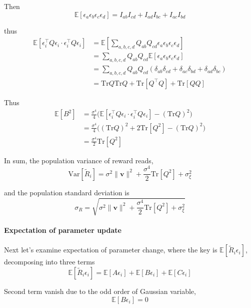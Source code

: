     Then 
    \[
    \mathbb{E}[\epsilon_{a}\epsilon_{b}\epsilon_{c}\epsilon_{d}]=I_{ab}I_{cd}+I_{ad}I_{bc}+I_{ac}I_{bd}
    \]
    
    thus 
    \begin{align*}
    \mathbb{E}[\epsilon_{i}^{\top}Q\epsilon_{i}\cdot\epsilon_{i}^{\top}Q\epsilon_{i}] & =\mathbb{E}[\sum_{a,b,c,d}Q_{ab}Q_{cd}\epsilon_{a}\epsilon_{b}\epsilon_{c}\epsilon_{d}]\\
     & =\sum_{a,b,c,d}Q_{ab}Q_{cd}\mathbb{E}[\epsilon_{a}\epsilon_{b}\epsilon_{c}\epsilon_{d}]\\
     & =\sum_{a,b,c,d}Q_{ab}Q_{cd}(\delta_{ab}\delta_{cd}+\delta_{ac}\delta_{bd}+\delta_{ad}\delta_{bc})\\
     & =\mathrm{Tr}Q\mathrm{Tr}Q+\mathrm{Tr}[Q^{\top}Q]+\mathrm{Tr}[QQ]
    \end{align*}
    
    Thus 
    \begin{align*}
    \mathbb{E}[B^{2}] & =\frac{\sigma^{4}}{4}\Big(\mathbb{E}[\epsilon_{i}^{\top}Q\epsilon_{i}\cdot\epsilon_{i}^{\top}Q\epsilon_{i}]-(\mathrm{Tr}Q)^{2}\Big)\\
     & =\frac{\sigma^{4}}{4}\Big((\mathrm{Tr}Q)^{2}+2\mathrm{Tr}[Q^{2}]-(\mathrm{Tr}Q)^{2}\Big)\\
     & =\frac{\sigma^{4}}{2}\mathrm{Tr}[Q^{2}]
    \end{align*}
    
    In sum, the population variance of reward reads, 
    \[
    \mathrm{Var}[\tilde{R}_{i}]=\sigma^{2}\|\mathbf{v}\|^{2}+\frac{\sigma^{4}}{2}\mathrm{Tr}[Q^{2}]+\sigma_{\xi}^{2}
    \]
    
    and the population standard deviation is 
    \[
    \sigma_{R}=\sqrt{\sigma^{2}\|\mathbf{v}\|^{2}+\frac{\sigma^{4}}{2}\mathrm{Tr}[Q^{2}]+\sigma_{\xi}^{2}}
    \]
    
    
    \paragraph{Expectation of parameter update}
    
    Next let's examine expectation of parameter change, where the key
    is $\mathbb{E}[\tilde{R}_{i}\epsilon_{i}]$, decomposing into three
    terms
    \[
    \mathbb{E}[\tilde{R}_{i}\epsilon_{i}]=\mathbb{E}[A\epsilon_{i}]+\mathbb{E}[B\epsilon_{i}]+\mathbb{E}[C\epsilon_{i}]
    \]
    
    Second term vanish due to the odd order of Gaussian variable, 
    \[
    \mathbb{E}[B\epsilon_{i}]=0
    \]
    
